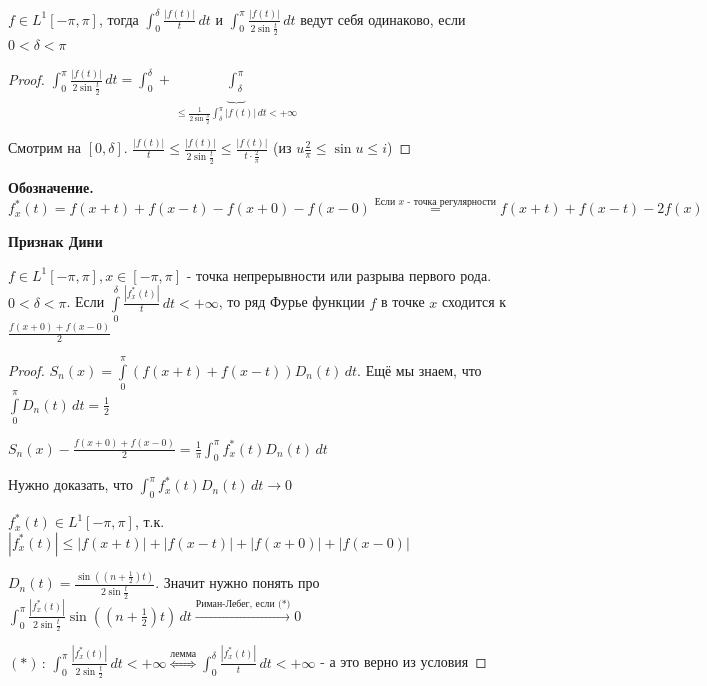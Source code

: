 \begin{lemma}
    $f \in L^1 [-\pi, \pi]$, тогда $\int_0^\delta \frac{|f(t)|}{t} \, dt$ и $\int_0^\pi \frac{|f(t)|}{2\sin \frac{t}{2}} \, dt$ ведут себя одинаково,
    если $0 < \delta < \pi$
\end{lemma}

\begin{proof}
    $\int_0^\pi \frac{|f(t)|}{2\sin \frac{t}{2}} \, dt = \int_0^\delta + \underbrace{\int_\delta^\pi}_{\leqslant \frac{1}{2\sin \frac{\delta}{2}} \int_\delta^\pi |f(t)| \, dt < +\infty } $

    Смотрим на $[0, \delta]$. $\frac{|f(t)|}{t} \leqslant \frac{|f(t)|}{2 \sin \frac{t}{2}} \leqslant \frac{|f(t)|}{t \cdot \frac{2}{\pi}}$ (из $u \frac{2}{\pi} \leqslant \sin u \leqslant i$)
\end{proof}

\textbf{Обозначение. }  $f_x^* (t) = f(x + t) + f(x - t) - f(x + 0) - f(x - 0) \overset{\text{Если $x$ - точка регулярности}}{=} f(x + t) + f(x - t) - 2f(x)$

\begin{theorem}
    \textbf{Признак Дини}

    $f \in L^{1} [-\pi, \pi], x \in [-\pi, \pi]$ - точка непрерывности или разрыва первого рода. $0 < \delta < \pi$. Если $\int\limits_0^\delta \frac{|f_x^* (t)|}{t} \, dt < +\infty$, то ряд Фурье
    функции $f$ в точке $x$ сходится к $\frac{f(x + 0) + f(x - 0)}{2}$
\end{theorem}

\begin{proof}
    $S_n (x) = \int\limits_0^\pi (f(x + t) + f(x - t)) D_n (t) \, dt$. Ещё мы знаем, что $\int\limits_0^\pi D_n (t) \, dt = \frac{1}{2}$

    $S_n(x) - \frac{f(x + 0) + f(x - 0)}{2} = \frac{1}{\pi} \int_0^\pi f_x^* (t) D_n (t) \, dt $

    Нужно доказать, что $\int_0^\pi f_x^* (t) D_n (t) \, dt \rightarrow 0$

    $f_x^* (t) \in L^1 [-\pi, \pi]$, т.к. $|f_x^* (t)| \leqslant |f(x + t)| + |f(x - t)| + |f(x + 0)| + |f(x - 0)|$

    $D_n(t) = \frac{\sin ((n + \frac{1}{2})t)}{2\sin \frac{t}{2}}$. Значит нужно понять про $\int_0^\pi \frac{|f_x^* (t)|}{2 \sin \frac{t}{2}} \sin ((n + \frac{1}{2})t) \, dt \overset{\text{Риман-Лебег, если (*)}}{\rightarrow} 0$

    $(*) \, : \, \int_0^\pi \frac{|f_x^* (t)|}{2 \sin \frac{t}{2}} \, dt < +\infty \overset{\text{лемма}}{\Longleftrightarrow} \int_0^\delta \frac{|f_x^* (t)|}{t} \, dt < +\infty$ - а это верно из условия
\end{proof}


